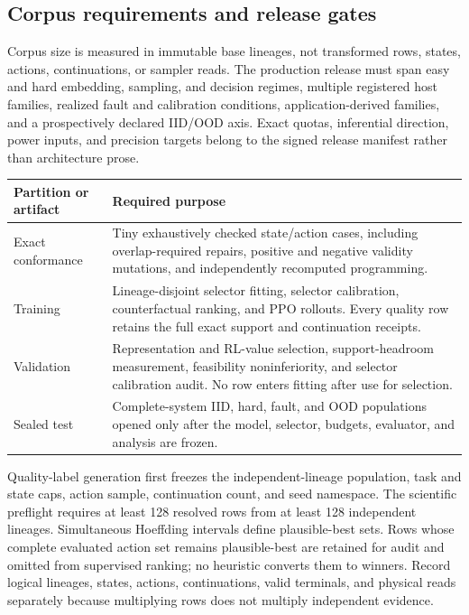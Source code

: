 \documentclass[11pt,a4paper]{article}
\theoremstyle{definition}\newtheorem{definition}[proposition]{Definition}
\begin{document}
\subsection{Corpus requirements and release gates}
\label{data:plan}

Corpus size is measured in immutable base lineages, not transformed rows, states, actions, continuations, or sampler reads. The production release must span easy and hard embedding, sampling, and decision regimes, multiple registered host families, realized fault and calibration conditions, application-derived families, and a prospectively declared IID/OOD axis. Exact quotas, inferential direction, power inputs, and precision targets belong to the signed release manifest rather than architecture prose.

{\small
\begin{longtable}{@{}p{}p{}@{}}
\toprule
Partition or artifact & Required purpose \\
\midrule
\endhead
Exact conformance & Tiny exhaustively checked state/action cases, including overlap-required repairs, positive and negative validity mutations, and independently recomputed programming. \\
Training & Lineage-disjoint selector fitting, selector calibration, counterfactual ranking, and PPO rollouts. Every quality row retains the full exact support and continuation receipts. \\
Validation & Representation and RL-value selection, support-headroom measurement, feasibility noninferiority, and selector calibration audit. No row enters fitting after use for selection. \\
Sealed test & Complete-system IID, hard, fault, and OOD populations opened only after the model, selector, budgets, evaluator, and analysis are frozen. \\
\bottomrule
\end{longtable}}

Quality-label generation first freezes the independent-lineage population, task and state caps, action sample, continuation count, and seed namespace. The scientific preflight requires at least 128 resolved rows from at least 128 independent lineages. Simultaneous Hoeffding intervals define plausible-best sets. Rows whose complete evaluated action set remains plausible-best are retained for audit and omitted from supervised ranking; no heuristic converts them to winners. Record logical lineages, states, actions, continuations, valid terminals, and physical reads separately because multiplying rows does not multiply independent evidence.
\end{document}
